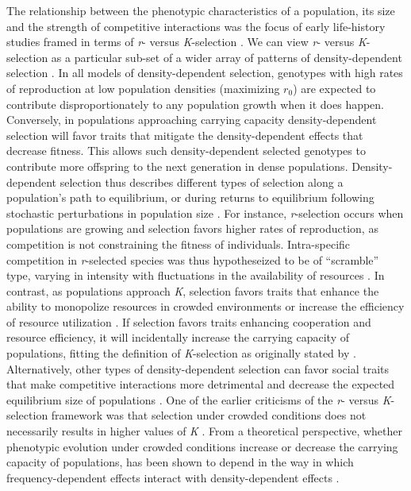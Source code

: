 \documentclass{article}
\begin{document}
 The relationship between the phenotypic characteristics of a population, its size and the strength of competitive interactions was the focus of early life-history studies framed in terms of \textit{r}- versus \textit{K}-selection \citep{macarthur1967theory}. We can view \textit{r}- versus \textit{K}-selection as a particular sub-set of a wider array of patterns of density-dependent selection \citep{Wright2018, Engen2020}. In all models of density-dependent selection, genotypes with high rates of reproduction at low population densities (maximizing $r_0$) are expected to contribute disproportionately to any population growth when it does happen. Conversely, in populations approaching carrying capacity density-dependent selection will favor traits that mitigate the density-dependent effects that decrease fitness. This allows such density-dependent selected genotypes to contribute more offspring to the next generation in dense populations. Density-dependent selection thus describes different types of selection along a population's path to equilibrium, or during returns to equilibrium following stochastic perturbations in population size \citep{Engen2013}. For instance, \textit{r}-selection occurs when populations are growing and selection favors higher rates of reproduction, as competition is not constraining the fitness of individuals. Intra-specific competition in \textit{r}-selected species was thus hypotheseized to be of “scramble” type, varying in intensity with fluctuations in the availability of resources \citep{Southwood1977}. In contrast, as populations approach \textit{K}, selection favors traits that enhance the ability to monopolize resources in crowded environments or increase the efficiency of resource utilization \citep{Boyce1984}. If selection favors traits enhancing cooperation and resource efficiency, it will incidentally increase the carrying capacity of populations, fitting the definition of \textit{K}-selection as originally stated by \cite{macarthur1967theory}. Alternatively, other types of density-dependent selection can favor social traits that make competitive interactions more detrimental and decrease the expected equilibrium size of populations \citep{Joshi2001, Engen2020}. One of the earlier criticisms of the \textit{r}- versus \textit{K}-selection framework was that selection under crowded conditions does not necessarily results in higher values of \textit{K} \citep{Boyce1984}. From a theoretical perspective, whether phenotypic evolution under crowded conditions increase or decrease the carrying capacity of populations, has been shown to depend in the way in which frequency-dependent effects interact with  density-dependent effects \citep{Engen2020}. 
\end{document}
